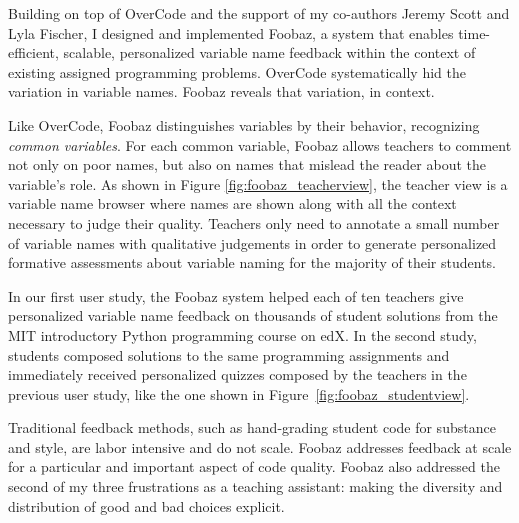Building on top of OverCode and the support of my co-authors Jeremy Scott and Lyla Fischer, I designed and implemented Foobaz, a system that enables time-efficient, scalable, personalized variable name feedback within the context of existing assigned programming problems. OverCode systematically hid the variation in variable names. Foobaz reveals that variation, in context. %

Like OverCode, Foobaz distinguishes variables by their behavior, recognizing {\it common variables}. For each common variable, Foobaz allows teachers to comment not only on poor names, but also on names that mislead the reader about the variable's role. As shown in Figure \ref{fig:foobaz_teacherview}, the teacher view is a variable name browser where names are shown along with all the context necessary to judge their quality. Teachers only need to annotate a small number of variable names with qualitative judgements in order to generate personalized formative assessments about variable naming for the majority of their students.

In our first user study, the Foobaz system helped each of ten teachers give personalized variable name feedback on thousands of student solutions from the MIT introductory Python programming course on edX. In the second study, students composed solutions to the same programming assignments and immediately received personalized quizzes composed by the teachers in the previous user study, like the one shown in Figure~\ref{fig:foobaz_studentview}.

Traditional feedback methods, such as hand-grading student code for substance and style, are labor intensive and do not scale. Foobaz addresses feedback at scale for a particular and important aspect of code quality. Foobaz also addressed the second of my three frustrations as a teaching assistant: making the diversity and distribution of good and bad choices explicit. %

